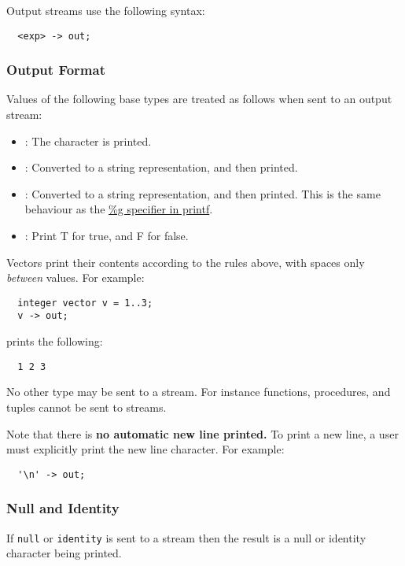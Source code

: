 \documentclass[streams.tex]{subfiles}
\begin{document}
Output streams use the following syntax:
\begin{lstlisting}
  <exp> -> out;
\end{lstlisting}

\subsubsection{Output Format}
\label{sssec:output_format}
Values of the following base types are treated as follows when sent to an output stream:
\begin{itemize}
  \item
    : The character is printed.
  \item
    : Converted to a string representation, and then printed.
  \item
    : Converted to a string representation, and then printed. This is the same behaviour
    as the \href{http://www.cplusplus.com/reference/cstdio/printf/	}{\%g specifier in printf}.
  \item
    : Print T for true, and F for false.
\end{itemize}

Vectors print their contents according to the rules above, with spaces only \textit{between} values.
For example:
\begin{lstlisting}
  integer vector v = 1..3;
  v -> out;
\end{lstlisting}

prints the following:
\begin{lstlisting}
  1 2 3
\end{lstlisting}

No other type may be sent to a stream. For instance functions, procedures, and tuples cannot be sent
to streams.

Note that there is \textbf{no automatic new line printed.} To print a new line, a user must
explicitly print the new line character. For example:
\begin{lstlisting}
  '\n' -> out;
\end{lstlisting}

\subsubsection{Null and Identity}
\label{sssec:stream_nai}
If \texttt{null} or \texttt{identity} is sent to a stream then the result is a null or identity
character being printed.
\end{document}
